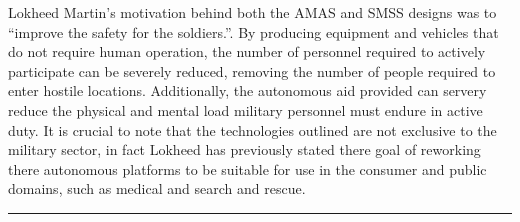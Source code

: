 Lokheed Martin's motivation behind both the AMAS and SMSS designs was to
``improve the safety for the soldiers.''.
By producing equipment and vehicles that do not require human operation, the
number of personnel required to actively participate can be severely reduced,
removing the number of people required to enter hostile locations.
Additionally, the autonomous aid provided can servery reduce the physical and
mental load military personnel must endure in active duty.
It is crucial to note that the technologies outlined are not exclusive to
the military sector, in fact Lokheed has previously stated there goal of
reworking there autonomous platforms to be suitable for use in the consumer and
public domains, such as medical and search and rescue.

\noindent\rule{\textwidth}{1pt}
